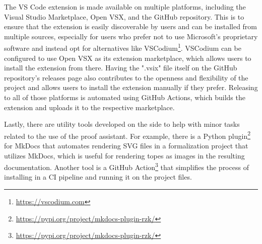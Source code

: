The VS Code extension is made available on multiple platforms, including the Visual Studio Marketplace, Open VSX, and the GitHub repository.
This is to ensure that the extension is easily discoverable by users and can be installed from multiple sources, especially for users
who prefer not to use Microsoft's proprietary software and instead opt for alternatives like VSCodium\footnote{\url{https://vscodium.com}}.
VSCodium can be configured to use Open VSX as its extension marketplace, which allows users to install the extension from there.
Having the ".vsix" file itself on the GitHub repository's releases page also contributes to the openness and flexibility of the project
and allows users to install the extension manually if they prefer.
Releasing to all of those platforms is automated using GitHub Actions, which builds the extension and uploads it to the respective marketplace.

Lastly, there are utility tools developed on the side to help with minor tasks related to the use of the proof assistant.
For example, there is a Python plugin\footnote{\url{https://pypi.org/project/mkdocs-plugin-rzk/}} for MkDocs that automates rendering
SVG files in a formalization project that utilizes MkDocs, which is useful for rendering topes as images in the resulting documentation.
Another tool is a GitHub Action\footnote{\url{https://pypi.org/project/mkdocs-plugin-rzk/}} that simplifies the process
of installing \Rzk{} in a CI pipeline and running it on the project files.
